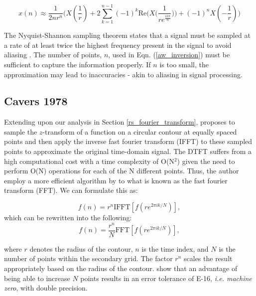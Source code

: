 \documentclass[a4paper]{report}
\begin{document}
\begin{equation}\label{aw_inversion}
	x(n) \approx \frac{1}{2nr^n} \biggr( X(\frac{1}{r}) + 2\sum^{n-1}_{k = 1} (-1)^k \text{Re}\bigg( X\big(\frac{1}{re^{\frac{ik\pi}{n}}}\big)\bigg) + (-1)^nX(-\frac{1}{r}) \biggl)
\end{equation}

The Nyquist-Shannon sampling theorem states that a signal must be sampled at a rate of at least twice the highest frequency present in the signal to avoid aliasing \citep{shannon1949communication,nyquist1928certain}. The number of points, $n$, used in Eqn. (\ref{aw_inversion}) must be sufficient to capture the information properly. If $n$ is too small, the approximation may lead to inaccuracies - akin to aliasing in signal processing.

\subsection{Cavers 1978}\label{cavers_section}
Extending upon our analysis in Section \ref{rs_fourier_transform}, \citet{Cavers1978FFT} proposes to sample the $z$-transform of a function on a circular contour at equally spaced points and then apply the inverse fast fourier transform (IFFT) to these sampled points to approximate the original time-domain signal. The DTFT suffers from a high computational cost with a time complexity of O(N$^2$) given the need to perform O(N) operations for each of the N different points. Thus, the author employ a more efficient algorithm by \citet{cooley1965algorithm} to what is known as the fast fourier transform (FFT). We can formulate this as:

\begin{equation}\label{cavers}
	f(n) = r^n \text{IFFT}[f(re^{2\pi ik / N})],
\end{equation}
which can be rewritten into the following:
\begin{equation}
		f(n) = \frac{r^n}{N} \text{FFT}[f(re^{2\pi ik / N})],
\end{equation}

where $r$ denotes the radius of the contour, $n$ is the time index, and $N$ is the number of points within the secondary grid. The factor $r^n$ scales the result appropriately based on the radius of the contour. \citet{loveless2021guido} show that an advantage of being able to increase $N$ points results in an error tolerance of E-16, \textit{i.e. machine zero}, with double precision.
\end{document}
